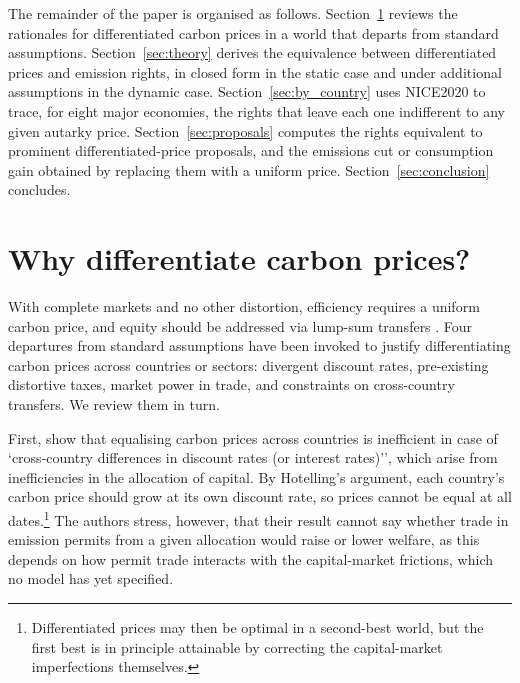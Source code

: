 \documentclass[12pt,english]{article}
\theoremstyle{remark}
\begin{document}
The remainder of the paper is organised as follows. Section~\ref{sec:arguments} reviews the rationales for differentiated carbon prices in a world that departs from standard assumptions. Section~\ref{sec:theory} derives the equivalence between differentiated prices and emission rights, in closed form in the static case and under additional assumptions in the dynamic case. Section~\ref{sec:by_country} uses NICE2020 to trace, for eight major economies, the rights that leave each one indifferent to any given autarky price. Section~\ref{sec:proposals} computes the rights equivalent to prominent differentiated-price proposals, and the emissions cut or consumption gain obtained by replacing them with a uniform price. Section~\ref{sec:conclusion} concludes.

\section{Why differentiate carbon prices?}
\label{sec:arguments}

With complete markets and no other distortion, %
efficiency requires a uniform carbon price, and equity should be addressed via lump-sum transfers \citep{sandmo_global_2007}. %
Four departures from standard assumptions have been invoked to justify differentiating carbon prices across countries or sectors: divergent discount rates, pre-existing distortive taxes, market power in trade, and constraints on cross-country transfers. We review them in turn.

First, \citet{anthoff_differentiated_2026} show that equalising carbon prices across countries is inefficient in case of `cross-country differences in discount rates (or interest rates)'', which arise from inefficiencies in the allocation of capital. By Hotelling's argument, each country's carbon price should grow at its own discount rate, so prices cannot be equal at all dates.\footnote{Differentiated prices may then be optimal in a second-best world, but the first best is in principle attainable by correcting the capital-market imperfections themselves.} The authors stress, however, that their result cannot say whether trade in emission permits from a given allocation would raise or lower welfare, as this depends on how permit trade interacts with the capital-market frictions, which no model has yet specified.
\end{document}

